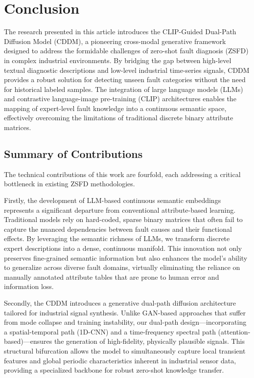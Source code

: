 \section{Conclusion}

The research presented in this article introduces the CLIP-Guided Dual-Path Diffusion Model (CDDM), a pioneering cross-modal generative framework designed to address the formidable challenges of zero-shot fault diagnosis (ZSFD) in complex industrial environments. By bridging the gap between high-level textual diagnostic descriptions and low-level industrial time-series signals, CDDM provides a robust solution for detecting unseen fault categories without the need for historical labeled samples. The integration of large language models (LLMs) and contrastive language-image pre-training (CLIP) architectures enables the mapping of expert-level fault knowledge into a continuous semantic space, effectively overcoming the limitations of traditional discrete binary attribute matrices.

\subsection{Summary of Contributions}
The technical contributions of this work are fourfold, each addressing a critical bottleneck in existing ZSFD methodologies.

Firstly, the development of LLM-based continuous semantic embeddings represents a significant departure from conventional attribute-based learning. Traditional models rely on hard-coded, sparse binary matrices that often fail to capture the nuanced dependencies between fault causes and their functional effects. By leveraging the semantic richness of LLMs, we transform discrete expert descriptions into a dense, continuous manifold. This innovation not only preserves fine-grained semantic information but also enhances the model's ability to generalize across diverse fault domains, virtually eliminating the reliance on manually annotated attribute tables that are prone to human error and information loss.

Secondly, the CDDM introduces a generative dual-path diffusion architecture tailored for industrial signal synthesis. Unlike GAN-based approaches that suffer from mode collapse and training instability, our dual-path design—incorporating a spatial-temporal path (1D-CNN) and a time-frequency spectral path (attention-based)—ensures the generation of high-fidelity, physically plausible signals. This structural bifurcation allows the model to simultaneously capture local transient features and global periodic characteristics inherent in industrial sensor data, providing a specialized backbone for robust zero-shot knowledge transfer.


